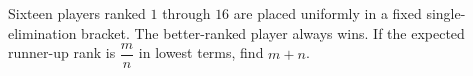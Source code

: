 Sixteen players ranked $1$ through $16$ are placed uniformly in a fixed single-elimination bracket. The better-ranked player always wins. If the expected runner-up rank is $\dfrac{m}{n}$ in lowest terms, find $m+n$.

